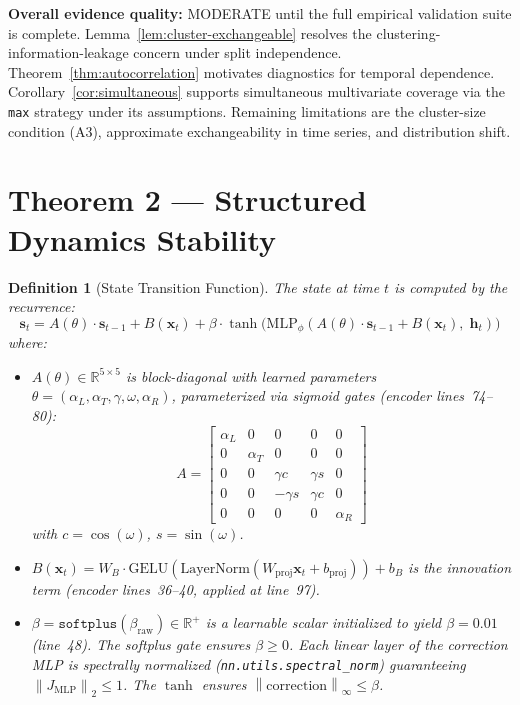 \documentclass[11pt]{article}
\newtheorem{definition}[theorem]{Definition}
\newcommand{\R}{\mathbb{R}}
\newcommand{\norm}[1]{\left\lVert#1\right\rVert}
\begin{document}
\textbf{Overall evidence quality:} MODERATE until the full empirical validation suite is complete. Lemma~\ref{lem:cluster-exchangeable} resolves the clustering-information-leakage concern under split independence. Theorem~\ref{thm:autocorrelation} motivates diagnostics for temporal dependence. Corollary~\ref{cor:simultaneous} supports simultaneous multivariate coverage via the \texttt{max} strategy under its assumptions. Remaining limitations are the cluster-size condition (A3), approximate exchangeability in time series, and distribution shift.

\section{Theorem 2 — Structured Dynamics Stability}

\begin{definition}[State Transition Function]\label{def:transition}
The state at time $t$ is computed by the recurrence:
\begin{equation}\label{eq:recurrence}
\mathbf{s}_t = A(\theta) \cdot \mathbf{s}_{t-1} + B(\mathbf{x}_t) + \beta \cdot \tanh\big(\text{MLP}_\phi(A(\theta) \cdot \mathbf{s}_{t-1} + B(\mathbf{x}_t),\; \mathbf{h}_t)\big)
\end{equation}
where:
\begin{itemize}
    \item $A(\theta) \in \R^{5 \times 5}$ is block-diagonal with learned parameters $\theta = (\alpha_L, \alpha_T, \gamma, \omega, \alpha_R)$, parameterized via sigmoid gates (encoder lines~74--80):
    \[
    A = \begin{bmatrix}
    \alpha_L & 0       & 0        & 0        & 0      \\
    0        & \alpha_T& 0        & 0        & 0      \\
    0        & 0       & \gamma c & \gamma s & 0      \\
    0        & 0       & -\gamma s& \gamma c & 0      \\
    0        & 0       & 0        & 0        & \alpha_R
    \end{bmatrix}
    \]
    with $c = \cos(\omega)$, $s = \sin(\omega)$.
    \item $B(\mathbf{x}_t) = W_B \cdot \text{GELU}(\text{LayerNorm}(W_{\text{proj}}\mathbf{x}_t + b_{\text{proj}})) + b_B$ is the innovation term (encoder lines~36--40, applied at line~97).
    \item $\beta = \texttt{softplus}(\beta_{\text{raw}}) \in \R^+$ is a learnable scalar initialized to yield $\beta = 0.01$ (line~48). The softplus gate ensures $\beta \geq 0$. Each linear layer of the correction MLP is spectrally normalized (\texttt{nn.utils.spectral\_norm}) guaranteeing $\norm{J_{\text{MLP}}}_2 \leq 1$. The $\tanh$ ensures $\norm{\text{correction}}_\infty \leq \beta$.
\end{itemize}
\end{definition}
\end{document}
